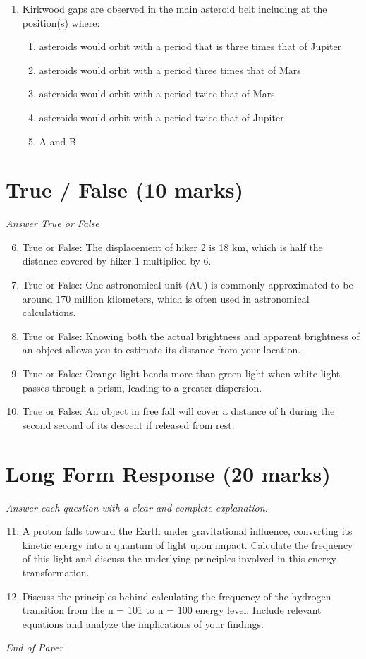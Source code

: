 \documentclass[12pt]{article}
\begin{document}
\begin{enumerate}[label=\arabic*.]
\begin{enumerate}[label=(\alph*)]
    \item taller
\end{enumerate}
\item Kirkwood gaps are observed in the main asteroid belt including at the position(s) where:
\begin{enumerate}[label=(\alph*)]
    \item asteroids would orbit with a period that is three times that of Jupiter
    \item asteroids would orbit with a period three times that of Mars
    \item asteroids would orbit with a period twice that of Mars
    \item asteroids would orbit with a period twice that of Jupiter
    \item A and B
\end{enumerate}
\end{enumerate}

\section*{True / False (10 marks)}
\textit{Answer True or False}
\begin{enumerate}[label=\arabic*.]
\setcounter{enumi}{5}
\item True or False: The displacement of hiker 2 is 18 km, which is half the distance covered by hiker 1 multiplied by 6.
\item True or False: One astronomical unit (AU) is commonly approximated to be around 170 million kilometers, which is often used in astronomical calculations.
\item True or False: Knowing both the actual brightness and apparent brightness of an object allows you to estimate its distance from your location.
\item True or False: Orange light bends more than green light when white light passes through a prism, leading to a greater dispersion.
\item True or False: An object in free fall will cover a distance of h during the second second of its descent if released from rest.
\end{enumerate}

\section*{Long Form Response (20 marks)}
\textit{Answer each question with a clear and complete explanation.}
\begin{enumerate}[label=\arabic*.]
\setcounter{enumi}{10}
\item A proton falls toward the Earth under gravitational influence, converting its kinetic energy into a quantum of light upon impact. Calculate the frequency of this light and discuss the underlying principles involved in this energy transformation.
\item Discuss the principles behind calculating the frequency of the hydrogen transition from the n = 101 to n = 100 energy level. Include relevant equations and analyze the implications of your findings.
\end{enumerate}

\vfill
\noindent\textit{End of Paper}
\end{document}

